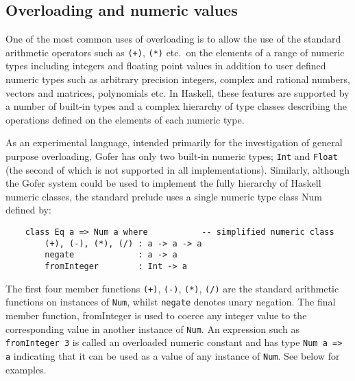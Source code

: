 \subsection{Overloading and numeric values}
One of the most common uses of overloading is to allow the use  of  the
standard arithmetic operators such as \verb"(+)", \verb"(*)" 
etc.\ on the elements  of
a range of numeric types including integers and floating point  values  in
addition to user defined numeric  types  such  as  arbitrary  precision
integers,  complex  and  rational  numbers,   vectors   and   matrices,
polynomials etc.  In Haskell, these features are supported by a  number
of built-in types and a complex hierarchy of  type  classes  describing
the operations defined on the elements of each numeric type.

As an experimental language, intended primarily for  the  investigation
of general purpose overloading, Gofer has  only  two  built-in  numeric
types; \verb"Int" and \verb"Float" 
(the second of  which  is  not  supported  in  all
implementations).  Similarly, although the Gofer system could  be  used
to implement the  fully  hierarchy  of  Haskell  numeric  classes,  the
standard prelude uses a single numeric type class Num defined by:
\begin{verbatim}
    class Eq a => Num a where           -- simplified numeric class
        (+), (-), (*), (/) : a -> a -> a
        negate             : a -> a
        fromInteger        : Int -> a
\end{verbatim}
The first four member functions \verb"(+)", \verb"(-)", 
\verb"(*)",  \verb"(/)"  are  the  standard
arithmetic functions on instances of \verb"Num", whilst 
\verb"negate" denotes unary
negation.  The final member function, fromInteger is used to coerce any
integer value to the corresponding value in another  instance  of  \verb"Num".
An expression such as \verb"fromInteger 3" is called an  overloaded  numeric
constant and has type \verb"Num a => a" indicating that it can be  used  as  a
value of any instance of \verb"Num".  See below for examples.

